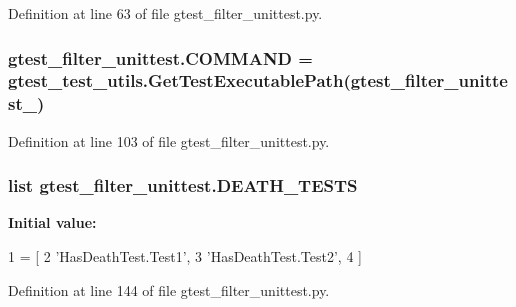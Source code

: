 Definition at line 63 of file gtest\+\_\+filter\+\_\+unittest.\+py.

\subsubsection[{\texorpdfstring{C\+O\+M\+M\+A\+ND}{COMMAND}}]{\setlength{\rightskip}{0pt plus 5cm}gtest\+\_\+filter\+\_\+unittest.\+C\+O\+M\+M\+A\+ND = {\bf gtest\+\_\+test\+\_\+utils.\+Get\+Test\+Executable\+Path}(\textquotesingle{}gtest\+\_\+filter\+\_\+unittest\+\_\+\textquotesingle{})}\hypertarget{namespacegtest__filter__unittest_aaf600b005b9c09e727b55b60fdf8f507}{}\label{namespacegtest__filter__unittest_aaf600b005b9c09e727b55b60fdf8f507}


Definition at line 103 of file gtest\+\_\+filter\+\_\+unittest.\+py.

\subsubsection[{\texorpdfstring{D\+E\+A\+T\+H\+\_\+\+T\+E\+S\+TS}{DEATH_TESTS}}]{\setlength{\rightskip}{0pt plus 5cm}list gtest\+\_\+filter\+\_\+unittest.\+D\+E\+A\+T\+H\+\_\+\+T\+E\+S\+TS}\hypertarget{namespacegtest__filter__unittest_ab14d082dc05c07458595606a64616d0b}{}\label{namespacegtest__filter__unittest_ab14d082dc05c07458595606a64616d0b}
{\bfseries Initial value\+:}
\begin{DoxyCode}
1 = [
2     \textcolor{stringliteral}{'HasDeathTest.Test1'},
3     \textcolor{stringliteral}{'HasDeathTest.Test2'},
4     ]
\end{DoxyCode}


Definition at line 144 of file gtest\+\_\+filter\+\_\+unittest.\+py.

